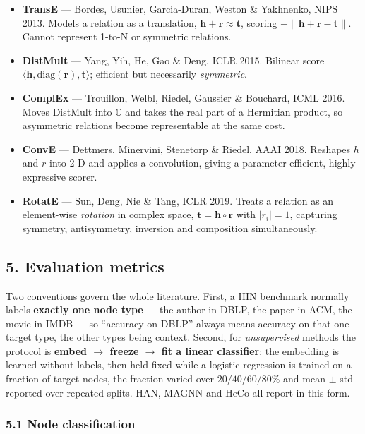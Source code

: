 \begin{itemize}\itemsep2pt
\item \textbf{TransE} --- Bordes, Usunier, Garcia-Duran, Weston \& Yakhnenko, NIPS 2013. Models a
  relation as a translation, $\mathbf{h}+\mathbf{r}\approx\mathbf{t}$, scoring
  $-\|\mathbf{h}+\mathbf{r}-\mathbf{t}\|$. Cannot represent 1-to-N or symmetric relations.
\item \textbf{DistMult} --- Yang, Yih, He, Gao \& Deng, ICLR 2015. Bilinear score
  $\langle\mathbf{h},\mathrm{diag}(\mathbf{r}),\mathbf{t}\rangle$; efficient but necessarily
  \emph{symmetric}.
\item \textbf{ComplEx} --- Trouillon, Welbl, Riedel, Gaussier \& Bouchard, ICML 2016. Moves
  DistMult into $\mathbb{C}$ and takes the real part of a Hermitian product, so asymmetric
  relations become representable at the same cost.
\item \textbf{ConvE} --- Dettmers, Minervini, Stenetorp \& Riedel, AAAI 2018. Reshapes $h$ and $r$
  into 2-D and applies a convolution, giving a parameter-efficient, highly expressive scorer.
\item \textbf{RotatE} --- Sun, Deng, Nie \& Tang, ICLR 2019. Treats a relation as an element-wise
  \emph{rotation} in complex space, $\mathbf{t}=\mathbf{h}\circ\mathbf{r}$ with
  $|r_i|=1$, capturing symmetry, antisymmetry, inversion and composition simultaneously.
\end{itemize}

\subsection*{5. Evaluation metrics}

Two conventions govern the whole literature. First, a HIN benchmark normally labels
\textbf{exactly one node type} --- the author in DBLP, the paper in ACM, the movie in IMDB --- so
``accuracy on DBLP'' always means accuracy on that one target type, the other types being context.
Second, for \emph{unsupervised} methods the protocol is \textbf{embed $\to$ freeze $\to$ fit a
linear classifier}: the embedding is learned without labels, then held fixed while a logistic
regression is trained on a fraction of target nodes, the fraction varied over $20/40/60/80\%$ and
mean $\pm$ std reported over repeated splits. HAN, MAGNN and HeCo all report in this form.

\subsubsection*{5.1 Node classification}

